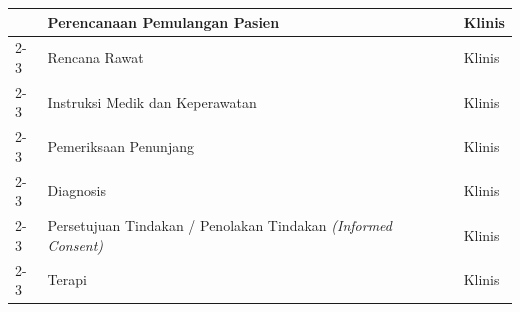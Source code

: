 \documentclass[bahasa, 12pt, a4paper, onecolumn, oneside, final]{report}
\begin{document}
\begin{longtable}{|p{4cm}|p{5.2cm}|p{3.2cm}|}
	                              & Perencanaan Pemulangan Pasien
	                              & Klinis                                                                \\ \cline{2-3}

	                              & Rencana Rawat
	                              & Klinis                                                                \\ \cline{2-3}

	                              & Instruksi Medik dan Keperawatan
	                              & Klinis                                                                \\ \cline{2-3}

	                              & Pemeriksaan Penunjang
	                              & Klinis                                                                \\ \cline{2-3}

	                              & Diagnosis
	                              & Klinis                                                                \\ \cline{2-3}

	                              & Persetujuan Tindakan / Penolakan Tindakan \textit{(Informed Consent)}
	                              & Klinis                                                                \\ \cline{2-3}

	                              & Terapi
	                              & Klinis                                                                \\ \hline
\end{longtable}
\end{document}
